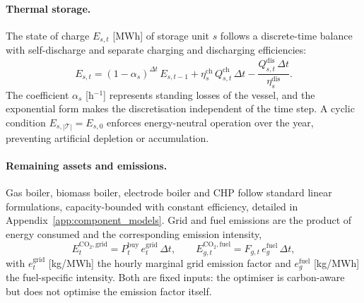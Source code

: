 \paragraph{Thermal storage.}
The state of charge $E_{s,t}$ [MWh] of storage unit $s$ follows a discrete-time balance
with self-discharge and separate charging and discharging efficiencies:
%
\begin{equation}
  E_{s,t} = (1 - \alpha_s)^{\Delta t}\, E_{s,t-1}
    + \eta_s^{\mathrm{ch}}\, Q_{s,t}^{\mathrm{ch}}\, \Delta t
    - \frac{Q_{s,t}^{\mathrm{dis}}\, \Delta t}{\eta_s^{\mathrm{dis}}}.
  \label{eq:storage_soc}
\end{equation}
%
The coefficient $\alpha_s$ [h$^{-1}$] represents standing losses of the vessel, and the
exponential form makes the discretisation independent of the time step. A cyclic
condition $E_{s,|\mathcal{T}|} = E_{s,0}$ enforces energy-neutral operation over the year,
preventing artificial depletion or accumulation.

\paragraph{Remaining assets and emissions.}
Gas boiler, biomass boiler, electrode boiler and CHP follow standard linear formulations,
capacity-bounded with constant efficiency, detailed in
Appendix~\ref{app:component_models}. Grid and fuel emissions are the product of energy
consumed and the corresponding emission intensity,
%
\begin{equation}
  E_t^{\mathrm{CO_2,grid}} =
    P_t^{\mathrm{buy}}\, e_t^{\mathrm{grid}}\, \Delta t,
  \qquad
  E_{g,t}^{\mathrm{CO_2,fuel}} =
    F_{g,t}\, e_g^{\mathrm{fuel}}\, \Delta t,
  \label{eq:emissions}
\end{equation}
%
with $e_t^{\mathrm{grid}}$ [kg/MWh] the hourly marginal grid emission factor and
$e_g^{\mathrm{fuel}}$ [kg/MWh] the fuel-specific intensity. Both are fixed inputs: the
optimiser is carbon-aware but does not optimise the emission factor itself.
